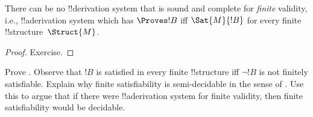\documentclass[../../../include/open-logic-section]{subfiles}
\begin{document}
\begin{cor}%
  There can be no !!{derivation} system that is sound and complete for
  \emph{finite} validity, i.e., !!a{derivation} system which has $\Proves !B$
  iff $\Sat{M}{!B}$ for every finite !!{structure}~$\Struct{M}$.
\end{cor}

\begin{proof}
  Exercise.
\end{proof}

\begin{prob}
  Prove . Observe that $!B$ is
  satisfied in every finite !!{structure} iff $\lnot !B$ is not
  finitely satisfiable.  Explain why finite satisfiability is
  semi-decidable in the sense of
  . Use this to argue that if
  there were !!a{derivation} system for finite validity, then finite
  satisfiability would be decidable.
\end{prob}
\end{document}
